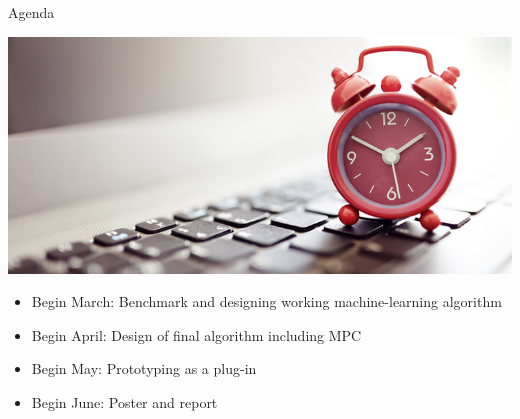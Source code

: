 \documentclass[11pt,t]{beamer}
\begin{document}
\begin{frame}{Agenda}
\begin{center}
    \includegraphics[width=.5\textwidth]{deadlines}
\end{center}
\begin{itemize}
    \item Begin March: Benchmark and designing working machine-learning algorithm
    \item Begin April: Design of final algorithm including MPC
    \item Begin May: Prototyping as a plug-in
    \item Begin June: Poster and report
\end{itemize}
\end{frame}
\end{document}
